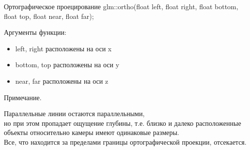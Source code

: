 \documentclass{beamer}
\begin{document}
	\begin{frame}{Ортографическое проецирование}
		glm::ortho(float left, float right, float bottom, float top, float near, float far);
		
		Аргументы функции:
		\begin{itemize}
			\item 
			left, right расположены на оси x
			\item 
			bottom, top расположены на оси y
			\item 
			near, far расположены на оси z
		\end{itemize}

		Примечание.

		Параллельные линии остаются параллельными,
		\\ но при этом пропадает ощущение глубины, т.е. близко и далеко расположенные объекты относительно камеры имеют одинаковые размеры.
		\\ Все, что находится за пределами границы ортографической проекции, отсекается.


	\end{frame}
	
\end{document}
